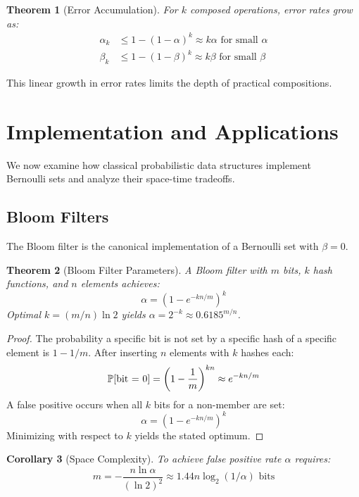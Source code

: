 \documentclass[11pt]{article}
\newtheorem{theorem}{Theorem}[section]
\newtheorem{corollary}[theorem]{Corollary}
\begin{document}
\begin{theorem}[Error Accumulation]
For $k$ composed operations, error rates grow as:
\begin{align}
\alpha_k &\leq 1 - (1-\alpha)^k \approx k\alpha \text{ for small } \alpha \\
\beta_k &\leq 1 - (1-\beta)^k \approx k\beta \text{ for small } \beta
\end{align}
\end{theorem}

This linear growth in error rates limits the depth of practical compositions.

\section{Implementation and Applications}
\label{sec:implementation}

We now examine how classical probabilistic data structures implement\\ Bernoulli sets and analyze their space-time tradeoffs.

\subsection{Bloom Filters}

The Bloom filter is the canonical implementation of a Bernoulli set with $\beta = 0$.

\begin{theorem}[Bloom Filter Parameters]
A Bloom filter with $m$ bits, $k$ hash functions, and $n$ elements achieves:
\[
\alpha = \left(1 - e^{-kn/m}\right)^k
\]
Optimal $k = (m/n)\ln 2$ yields
$\alpha = 2^{-k} \approx 0.6185^{m/n}$.
\end{theorem}

\begin{proof}
The probability a specific bit is not set by a specific hash of a specific element is $1-1/m$. After inserting $n$ elements with $k$ hashes each:
\[
\mathbb{P}[\text{bit = 0}] = \left(1 - \frac{1}{m}\right)^{kn} \approx e^{-kn/m}
\]
A false positive occurs when all $k$ bits for a non-member are set:
\[
\alpha = \left(1 - e^{-kn/m}\right)^k
\]
Minimizing with respect to $k$ yields the stated optimum.
\end{proof}

\begin{corollary}[Space Complexity]
To achieve false positive rate $\alpha$ requires:
\[
m = -\frac{n \ln \alpha}{(\ln 2)^2} \approx 1.44n \log_2(1/\alpha) \text{ bits}
\]
\end{corollary}
\end{document}
